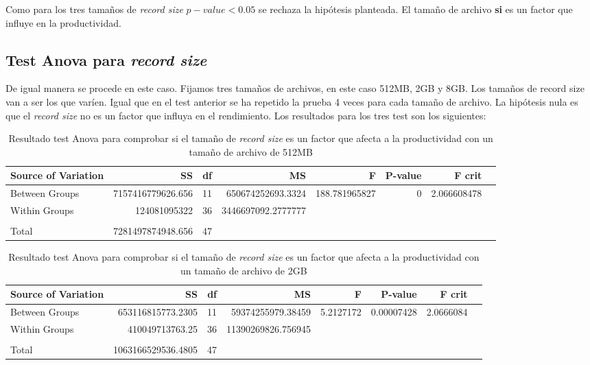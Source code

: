 Como para los tres tamaños de \textit{record size} $p-value < 0.05$ se rechaza la hipótesis planteada. El tamaño de archivo \textbf{si} es un factor que influye en la productividad.

\subsection{Test Anova para \textit{record size}}
De igual manera se procede en este caso. Fijamos tres tamaños de archivos, en este caso 512MB, 2GB y 8GB. Los tamaños de record size van a ser los que varíen. Igual que en el test anterior se ha repetido la prueba 4 veces para cada tamaño de archivo. La hipótesis nula es que el \textit{record size} no es un factor que influya en el rendimiento. Los resultados para los tres test son los siguientes:

\begin{table}[H]\centering
\scriptsize
\begin{tabular}{lrrrrrrr}\toprule
Source of Variation &SS &df &MS &F &P-value &F crit \\\midrule
Between Groups &7157416779626.656 &11 &650674252693.3324 &188.781965827 &0 &2.066608478 \\
Within Groups &124081095322 &36 &3446697092.2777777 & & & \\
& & & & & & \\
Total &7281497874948.656 &47 & & & & \\
\bottomrule
\end{tabular}
\caption{Resultado test Anova para comprobar si el tamaño de \textit{record size} es un factor que afecta a la productividad con un tamaño de archivo de 512MB}\label{tab: }
\end{table}

\begin{table}[H]\centering

\scriptsize
\begin{tabular}{lrrrrrrr}\toprule
Source of Variation &SS &df &MS &F &P-value &F crit \\\midrule
Between Groups &653116815773.2305 &11 &59374255979.38459 &5.2127172 &0.00007428 &2.0666084 \\
Within Groups &410049713763.25 &36 &11390269826.756945 & & & \\
& & & & & & \\
Total &1063166529536.4805 &47 & & & & \\
\bottomrule
\end{tabular}
\caption{Resultado test Anova para comprobar si el tamaño de \textit{record size} es un factor que afecta a la productividad con un tamaño de archivo de 2GB}\label{tab: }
\end{table}

